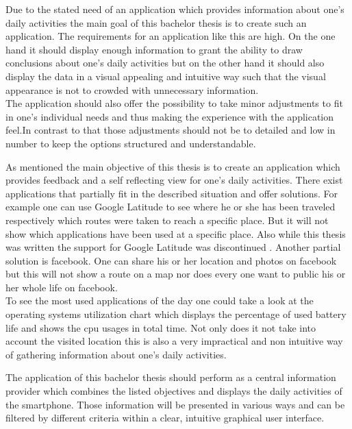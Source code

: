 Due  to the stated need of an application which provides information about one's daily activities the main goal of this bachelor thesis is to create such an application.
The requirements for an application like this are high. On the one hand it should display enough information to grant the ability to draw conclusions about one's daily activities but on the other hand it should also display the data in a visual appealing and intuitive way such that the visual appearance is not to crowded with unnecessary information.\\
The application should also offer the possibility to take minor adjustments to fit in one's individual needs and thus making the experience with the application feel.In contrast to that those adjustments should not be to detailed and low in number to keep the options structured and understandable.

As  mentioned the main objective of this thesis is to create an application which provides feedback and a self reflecting view for one's daily activities. There exist applications that partially fit in the described  situation and offer solutions. For example one can use Google Latitude to see where he or she has been traveled respectively which routes were taken to reach a specific place. But it will not show which applications have been used at a specific place. Also while this thesis was written the support for Google Latitude was discontinued \cite{googlelatitudedead}. Another partial solution is facebook. One can share his or her location and photos on facebook but this will not show a route on a map nor does every one want to public his or her whole life on facebook.\\
To see the most used applications of the day one could take a look at the operating systems utilization chart which displays the percentage of used battery life and shows the cpu usages in total time. Not only does it not take into account the visited location this is also a very impractical and non intuitive way of gathering information about one's daily activities.

The application of this bachelor thesis should perform as a central information provider which combines the listed objectives and displays the daily activities of the smartphone. Those information will be presented in various ways and can be filtered by different criteria within a clear, intuitive graphical user interface.